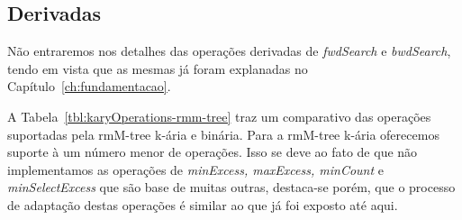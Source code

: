 \newpage
     \subsection{Derivadas}
     Não entraremos nos detalhes das operações derivadas de \textit{fwdSearch} e \textit{bwdSearch}, tendo em vista que as mesmas já foram explanadas no Capítulo~\ref{ch:fundamentacao}.  
     
     A Tabela~\ref{tbl:karyOperations-rmm-tree} traz um comparativo das operações suportadas pela rmM-tree k-ária e binária. Para a rmM-tree k-ária oferecemos suporte à um número menor de operações. Isso se deve ao fato de que não implementamos as operações de \textit{minExcess, maxExcess, minCount} e \textit{minSelectExcess} que são base de muitas outras, destaca-se porém, que o processo de adaptação destas operações é similar ao que já foi exposto até aqui.

     
